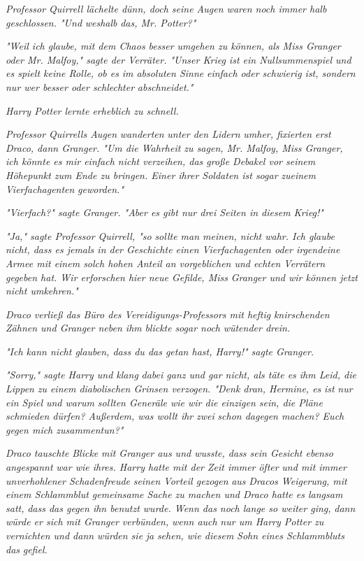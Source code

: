 {\emph{Professor Quirrell lächelte dünn, doch seine Augen waren noch immer halb geschlossen. "Und} \emph{weshalb} \emph{das, Mr. Potter?"}

\emph{"Weil ich glaube, mit dem Chaos besser umgehen zu können, als Miss Granger oder Mr. Malfoy," sagte der Verräter. "Unser Krieg ist ein Nullsummenspiel und es spielt keine Rolle, ob es} \emph{im absoluten Sinne} \emph{einfach oder schwierig ist, sondern nur wer besser oder schlechter} \emph{abschneidet."}

\emph{Harry Potter lernte erheblich zu schnell.}

\emph{Professor Quirrells Augen} \emph{wanderten} \emph{unter den Lidern} \emph{umher, fixierten erst Draco, dann Granger. "Um die Wahrheit zu sagen, Mr. Malfoy, Miss Granger, ich könnte es mir einfach nicht verzeihen, das große Debakel vor seinem Höhepunkt zum Ende zu bringen. Einer ihrer Soldaten ist sogar} \emph{zueinem} \emph{Vierfachagenten} \emph{geworden."}

\emph{"\emph{Vierfach?}" sagte Granger. "Aber es gibt nur drei Seiten in diesem Krieg!"}

\emph{"Ja," sagte Professor Quirrell, "so} \emph{sollte man meinen, nicht wahr. Ich glaube nicht, dass es jemals in der Geschichte einen Vierfachagenten oder irgendeine Armee mit einem solch hohen Anteil an vorgeblichen und echten Verrätern gegeben hat. Wir erforschen hier neue Gefilde, Miss} \emph{Granger und wir können jetzt nicht umkehren."}

\emph{Draco verließ das Büro des Vereidigungs-Professors mit heftig} \emph{knirschenden} \emph{Zähnen und Granger neben ihm} \emph{blickte} \emph{sogar noch} \emph{wütender drein.}

\emph{"Ich kann nicht glauben, dass du das getan hast, Harry!" sagte Granger.}

\emph{"Sorry," sagte Harry und klang} \emph{dabei ganz und gar nicht, als täte es ihm Leid, die Lippen} \emph{zu einem diabolischen Grinsen verzogen. "Denk dran, Hermine, es} \emph{\emph{ist}} \emph{nur ein Spiel und warum sollten Generäle wie wir die einzigen sein, die Pläne schmieden dürfen? Außerdem, was wollt ihr} \emph{zwei} \emph{schon dagegen machen? Euch gegen mich zusammentun?"}

\emph{Draco tauschte} \emph{Blicke} \emph{mit Granger aus und wusste, dass sein Gesicht ebenso} \emph{angespannt} \emph{war wie ihres. Harry hatte mit der Zeit immer} \emph{öfter} \emph{und mit immer unverhohlener Schadenfreude} \emph{seinen Vorteil gezogen} \emph{aus} \emph{Dracos Weigerung, mit einem Schlammblut gemeinsame Sache zu machen und Draco hatte es langsam} \emph{\emph{satt,}} \emph{dass das gegen ihn benutzt wurde. Wenn das noch lange so weiter ging,} \emph{dann} \emph{würde er sich mit Granger verbünden,} \emph{wenn auch} \emph{nur um Harry Potter zu vernichten und dann würden sie} \emph{ja} \emph{sehen, wie diesem} \emph{Sohn eines Schlammbluts} \emph{\emph{das}} \emph{gefiel.}

}
